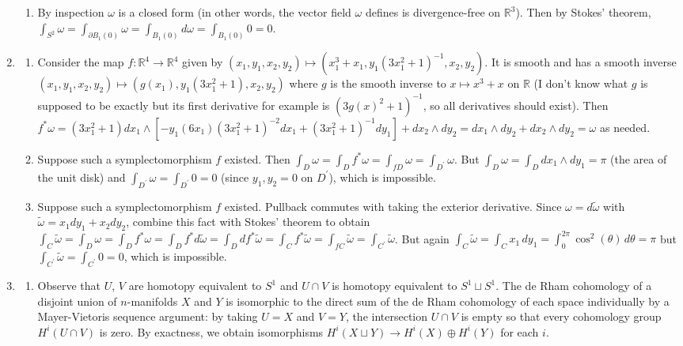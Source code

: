 \documentclass[11pt,leqno]{article}
\theoremstyle{plain}
\theoremstyle{definition}
\numberwithin{equation}{section}
\numberwithin{lem}{section}
\begin{document}
\begin{enumerate}
\begin{enumerate}
        \item By inspection $\omega$ is a closed form (in other words, the vector field $\omega$ defines is divergence-free on $\mathbb R^3$). Then by Stokes' theorem, $\int_{S^2}\omega = \int_{\partial B_1(0)}\omega = \int_{B_1(0)}d\omega = \int_{B_1(0)}0 = 0$.
    \end{enumerate}
    \item \begin{enumerate}
        \item Consider the map $f\colon \mathbb R^4\to \mathbb R^4$ given by $(x_1,y_1,x_2,y_2)\mapsto (x_1^3+x_1,y_1(3x_1^2+1)^{-1}, x_2,y_2)$. It is smooth and has a smooth inverse $(x_1,y_1,x_2,y_2)\mapsto (g(x_1),y_1(3x_1^2+1), x_2,y_2)$ where $g$ is the smooth inverse to $x\mapsto x^3+x$ on $\mathbb R$ (I don't know what $g$ is supposed to be exactly but its first derivative for example is $(3g(x)^2+1)^{-1}$, so all derivatives should exist). Then $f^\ast\omega = (3x_1^2+1)dx_1\wedge [-y_1(6x_1)(3x_1^2+1)^{-2}dx_1 + (3x_1^2+1)^{-1}dy_1] + dx_2\wedge dy_2 = dx_1\wedge dy_2 + dx_2\wedge dy_2 = \omega$ as needed.
        \item Suppose such a symplectomorphism $f$ existed. Then $\int_D \omega = \int_D f^\ast \omega = \int_{fD}\omega = \int_{D^\prime}\omega$. But $\int_D \omega = \int_D dx_1\wedge dy_1 = \pi$ (the area of the unit disk) and $\int_{D^\prime}\omega = \int_{D^\prime} 0 = 0$ (since $y_1,y_2 = 0$ on $D^\prime$), which is impossible.
        \item Suppose such a symplectomorphism $f$ existed. Pullback commutes with taking the exterior derivative. Since $\omega = d\tilde\omega$ with $\tilde \omega = x_1dy_1 + x_2dy_2$, combine this fact with Stokes' theorem to obtain $\int_C\tilde\omega = \int_D \omega = \int_D f^\ast\omega = \int_D f^\ast d\tilde\omega = \int_D df^\ast\tilde\omega = \int_C f^\ast \tilde\omega = \int_{fC}\tilde\omega = \int_{C^\prime}\tilde \omega$. But again $\int_C\tilde\omega = \int_Cx_1\,dy_1 = \int_0^{2\pi}\cos^2(\theta)\,d\theta = \pi$ but $\int_{C^\prime}\tilde\omega = \int_{C^\prime} 0 = 0$, which is impossible.
    \end{enumerate}
    \item \begin{enumerate}
        \item Observe that $U$, $V$ are homotopy equivalent to $S^1$ and $U\cap V$ is homotopy equivalent to $S^1\sqcup S^1$. The de Rham cohomology of a disjoint union of $n$-manifolds $X$ and $Y$ is isomorphic to the direct sum of the de Rham cohomology of each space individually by a Mayer-Vietoris sequence argument: by taking $U = X$ and $V = Y$, the intersection $U\cap V$ is empty so that every cohomology group $H^i(U\cap V)$ is zero. By exactness, we obtain isomorphisms $H^i(X\sqcup Y)\to H^i(X)\oplus H^i(Y)$ for each $i$.
        

\end{enumerate}
\end{enumerate}
\end{document}
